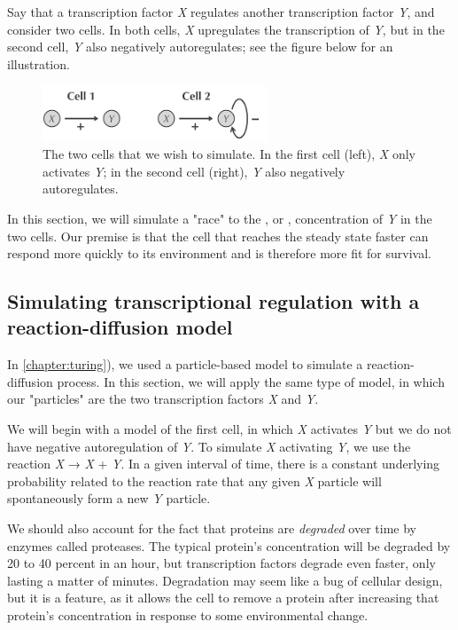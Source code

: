 Say that a transcription factor \textit{X} regulates another transcription factor \textit{Y}, and consider two cells. In both cells, \textit{X} upregulates the transcription of \textit{Y}, but in the second cell, \textit{Y} also negatively autoregulates; see the figure below for an illustration.

\begin{figure}[h]
\centering
\mySfFamily
\includegraphics[width = 0.6\textwidth]{../assets/images/600px/two_cells.png}
\caption{The two cells that we wish to simulate. In the first cell (left), \textit{X} only activates \textit{Y}; in the second cell (right), \textit{Y} also negatively autoregulates.}
\label{fig:two_cells}
\end{figure}

In this section, we will simulate a "race" to the , or , concentration of \textit{Y} in the two cells. Our premise is that the cell that reaches the steady state faster can respond more quickly to its environment and is therefore more fit for survival.

\FloatBarrier
{}
\subsection{Simulating transcriptional regulation with a reaction-diffusion model}

In \autoref{chapter:turing}), we used a particle-based model to simulate a reaction-diffusion process. In this section, we will apply the same type of model, in which our "particles" are the two transcription factors \textit{X} and \textit{Y}.

We will begin with a model of the first cell, in which \textit{X} activates \textit{Y} but we do not have negative autoregulation of \textit{Y}. To simulate \textit{X} activating \textit{Y}, we use the reaction \textit{X} → \textit{X} + \textit{Y}. In a given interval of time, there is a constant underlying probability related to the reaction rate that any given \textit{X} particle will spontaneously form a new \textit{Y} particle.

We should also account for the fact that proteins are \textit{degraded} over time by enzymes called proteases. The typical protein's concentration will be degraded by 20 to 40 percent in an hour, but transcription factors degrade even faster, only lasting a matter of minutes. Degradation may seem like a bug of cellular design, but it is a feature, as it allows the cell to remove a protein after increasing that protein's concentration in response to some environmental change.

